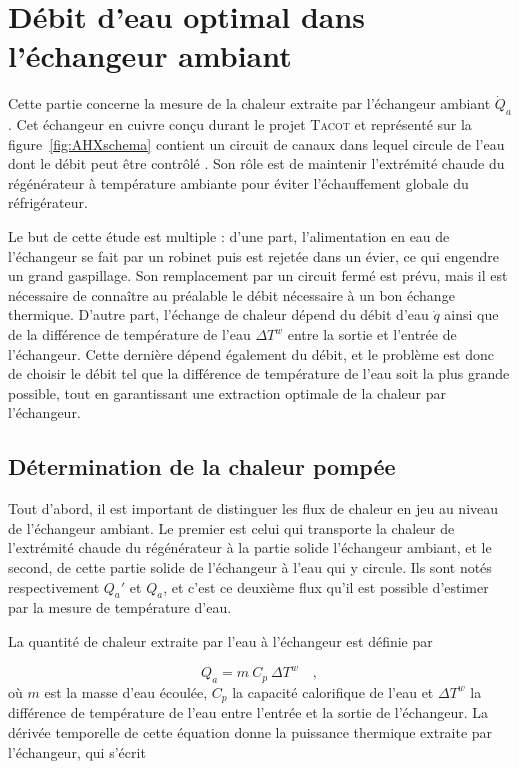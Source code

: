 \chapter{Débit d'eau optimal dans l'échangeur ambiant}\label{chap:AHX}

Cette partie concerne la mesure de la chaleur extraite par l'échangeur ambiant $\dot Q_a$. Cet échangeur en cuivre conçu durant le projet \textsc{Tacot} et représenté sur la figure~\ref{fig:AHXschema} contient un circuit de canaux dans lequel circule de l'eau dont le débit peut être contrôlé \cite{ANR_thermo-acoustic_2019, ramadan_design_2021}. Son rôle est de maintenir l'extrémité chaude du régénérateur à température ambiante pour éviter l'échauffement globale du réfrigérateur. 

Le but de cette étude est multiple : d'une part, l'alimentation en eau de l'échangeur se fait par un robinet puis est rejetée dans un évier, ce qui engendre un grand gaspillage. Son remplacement par un circuit fermé est prévu, mais il est nécessaire de connaître au préalable le débit nécessaire à un bon échange thermique. D'autre part, l'échange de chaleur dépend du débit d'eau $\dot q$ ainsi que de la différence de température de l'eau $\Delta T^w$ entre la sortie et l'entrée de l'échangeur. Cette dernière dépend également du débit, et le problème est donc de choisir le débit tel que la différence de température de l'eau soit la plus grande possible, tout en garantissant une extraction optimale de la chaleur par l'échangeur.

\section{Détermination de la chaleur pompée}
Tout d'abord, il est important de distinguer les flux de chaleur en jeu au niveau de l'échangeur ambiant. Le premier est celui qui transporte la chaleur de l'extrémité chaude du régénérateur à la partie solide l'échangeur ambiant, et le second, de cette partie solide de l'échangeur à l'eau qui y circule. Ils sont notés respectivement $Q_a'$ et $Q_a$, et c'est ce deuxième flux qu'il est possible d'estimer par la mesure de température d'eau.\smallskip

La quantité de chaleur extraite par l'eau à l'échangeur est définie par

\begin{equation}
    Q_a = m\ C_p\ \Delta T^w\quad,
    \label{eq:Qa_energie}
\end{equation}
où $m$ est la masse d'eau écoulée, $C_p$ la capacité calorifique de l'eau et $\Delta T^w$ la différence de température de l'eau entre l'entrée et la sortie de l'échangeur. La dérivée temporelle de cette équation donne la puissance thermique extraite par l'échangeur, qui s'écrit

